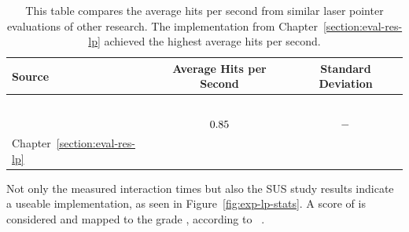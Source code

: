 \begin{table}[H]
	\centering
	\begin{tabular}{l c c}
		\toprule
		Source                                            & Average Hits per Second                                                            & Standard Deviation                                                                \\
		\midrule
		\citeauthor{Kamm.2018}~\cite{Kamm.2018}           & \pgfmathparse{\kammAvgHits}\pgfmathprintnumber[fixed, precision=2]{\pgfmathresult} & \pgfmathparse{\kammAvgStd}\pgfmathprintnumber[fixed, precision=2]{\pgfmathresult} \\%
		\citeauthor{JiYoungOh.2002}~\cite{JiYoungOh.2002} & $0.85{}$                                                                  & $-{}$                                                                  \\%
		Chapter~\ref{section:eval-res-lp}                 & \pgfmathparse{\oursAvgHits}\pgfmathprintnumber[fixed, precision=2]{\pgfmathresult} & \pgfmathparse{\oursAvgStd}\pgfmathprintnumber[fixed, precision=2]{\pgfmathresult} \\
		\bottomrule
	\end{tabular}
	\caption[Comparison of laser pointer task results]{This table compares the average hits per second from similar laser pointer evaluations of other research. The implementation from Chapter~\ref{section:eval-res-lp} achieved the highest average hits per second.}\label{tab:lp-comp}
\end{table}

Not only the measured interaction times but also the \gls{SUS} study results indicate a useable implementation, as seen in Figure~\ref{fig:exp-lp-stats}. A score of \evalExpLpSusScore{} is considered \evalExpLpSusAdj{} and mapped to the grade \evalExpLpSusGrade{}, according to \citeauthor{Bangor.2009}~\cite[120\psq]{Bangor.2009}.

